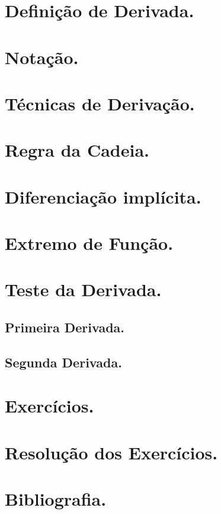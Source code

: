 \documentclass[a4paper,12pt]{article}
\begin{document}
\section{Defini\c{c}\~ao de Derivada.}

\section{Nota\c{c}\~ao.}

\section{T\'ecnicas de Deriva\c{c}\~ao.}

\section{Regra da Cadeia.}

\section{Diferencia\c{c}\~ao impl\'icita.}

\section{Extremo de Fun\c{c}\~ao.}

\section{Teste da Derivada.}

\subsection{Primeira Derivada.}

\subsection{Segunda Derivada.}

\section{Exerc\'icios.}

\section {Resolu\c{c}\~ao dos Exerc\'icios.}

\section{Bibliografia.}
\end{document}
